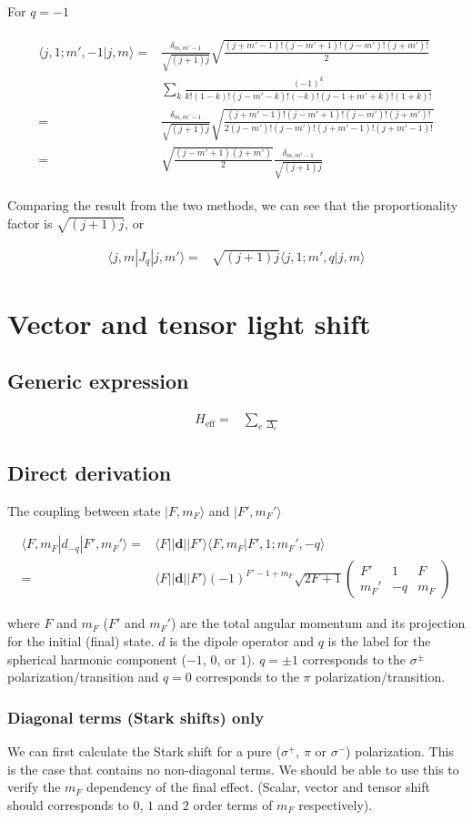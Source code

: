 \documentclass[10pt,fleqn]{article}
\newcommand{\eqar}[1]
{
  \begin{align}
    #1
  \end{align}
}
\begin{document}
For $q=-1$
\eqar{
  \begin{split}
    \langle j,1;m',-1|j,m\rangle=&\frac{\delta_{m,m'-1}}{\sqrt{(j+1)j}}\sqrt{\frac{(j+m'-1)!(j-m'+1)!(j-m')!(j+m')!}{2}}\\
                                 &\sum_k\frac{(-1)^k}{k!(1-k)!(j-m'-k)!(-k)!(j-1+m'+k)!(1+k)!}\\
    =&\frac{\delta_{m,m'-1}}{\sqrt{(j+1)j}}\sqrt{\frac{(j+m'-1)!(j-m'+1)!(j-m')!(j+m')!}{2(j-m')!(j-m')!(j+m'-1)!(j+m'-1)!}}\\
    =&\sqrt{\frac{(j-m'+1)(j+m')}{2}}\frac{\delta_{m,m'-1}}{\sqrt{(j+1)j}}
  \end{split}
}
Comparing the result from the two methods,
we can see that the proportionality factor is $\sqrt{(j+1)j}$, or
\eqar{
  \langle j,m|J_q|j,m'\rangle=&\sqrt{(j+1)j}\langle j,1;m',q|j,m\rangle
}


\section{Vector and tensor light shift}

\subsection{Generic expression}
\eqar{
  H_{\mathrm{eff}}=&\sum_{e}\frac{}{\Delta_e}
}

\subsection{Direct derivation}
The coupling between state $|F,m_F\rangle$ and $|F',m_F'\rangle$
\eqar{
  \langle F,m_F|d_{-q}|F',m_F'\rangle=&\langle F||\mathbf{d}||F'\rangle\langle F,m_F|F',1;m_F',-q\rangle\\
  =&\langle F||\mathbf{d}||F'\rangle (-1)^{F'-1+m_F}\sqrt{2F+1}
  \begin{pmatrix}
    F'&1&F\\
    m_F'&-q&m_F
  \end{pmatrix}
}
where $F$ and $m_F$ ($F'$ and $m_F'$) are the total angular momentum and its projection
for the initial (final) state. $d$ is the dipole operator and $q$ is the label
for the spherical harmonic component ($-1$, $0$, or $1$).
$q=\pm1$ corresponds to the $\sigma^\pm$ polarization/transition
and $q=0$ corresponds to the $\pi$ polarization/transition.\\

\subsubsection{Diagonal terms (Stark shifts) only}\label{stark-shift-explicit}
We can first calculate the Stark shift for a pure
($\sigma^+$, $\pi$ or $\sigma^-$) polarization.
This is the case that contains no non-diagonal terms.
We should be able to use this to verify the $m_F$ dependency of the final effect.
(Scalar, vector and tensor shift should corresponds to $0$, $1$ and $2$ order terms
of $m_F$ respectively).\\
\end{document}
